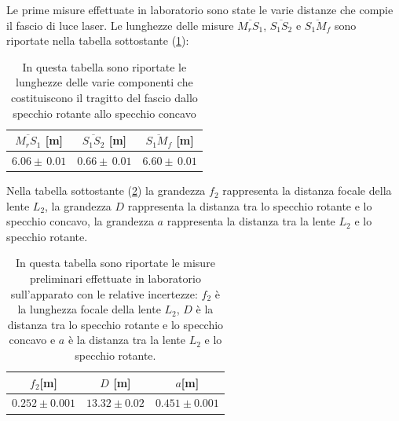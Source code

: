 Le prime misure effettuate in laboratorio sono state le varie distanze che compie il fascio di luce laser. 
Le lunghezze delle misure $\overline{M_rS_1}$, $\overline{S_1S_2}$ e $\overline{S_1M_f}$ sono riportate nella tabella sottostante (\ref{parziali di D}):
 \begin{table}[ht]
    \centering
    \begin{tabular}{|c|c|c|}
    \hline
     $\overline{M_rS_1}$ [m] & $\overline{S_1S_2}$ [m] & $\overline{S_1M_f}$ [m]\\
    \hline
    $6.06 \pm\, 0.01$ & $0.66 \pm\, 0.01$ & $6.60 \pm\, 0.01$ \\
    \hline
    \end{tabular}
    \caption{In questa tabella sono riportate le lunghezze delle varie componenti che costituiscono il tragitto del fascio dallo specchio rotante allo specchio concavo }
    \label{parziali di D}
\end{table}




Nella tabella sottostante (\ref{primidati}) la grandezza $f_2$ rappresenta la distanza focale della lente $L_2$, la grandezza $D$ rappresenta la distanza tra lo specchio rotante e lo specchio concavo, la grandezza $a$ rappresenta la distanza tra la lente $L_2$ e lo specchio rotante.
\begin{table}[ht]
    \centering
    \begin{tabular}{|c|c|c|}
    \hline
     $f_2$[m] & $D$ [m] & $a$[m] \\
    \hline
    $0.252\pm0.001$ & $13.32\pm0.02$ & $0.451\pm0.001$ \\
    \hline
    \end{tabular}
    \caption{In questa tabella sono riportate le misure preliminari effettuate in laboratorio sull'apparato con le relative incertezze: $f_2$ è la lunghezza focale della lente $L_2$, $D$ è la distanza tra lo specchio rotante e lo specchio concavo e $a$ è la distanza tra la lente $L_2$ e lo specchio rotante.}
    \label{primidati}
\end{table}

